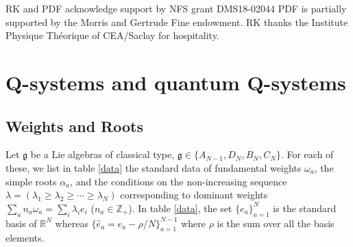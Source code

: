 \documentclass[12pt]{amsart}
\newcommand{\g}{{\mathfrak{g}}}
\newcommand{\Z}{{\mathbb Z}}
\newcommand{\R}{{\mathbb R}}
\numberwithin{equation}{section}
\numberwithin{table}{section}
\begin{document}
\bigskip

 RK and PDF acknowledge support by NFS grant DMS18-02044
PDF is partially supported by the Morris and Gertrude Fine endowment.
RK thanks the Institute Physique Th\'eorique of CEA/Saclay for hospitality.

\section{Q-systems and quantum Q-systems}

\subsection{Weights and Roots}\label{rootsec}



Let $\g$ be a Lie algebras of classical type, ${\mathfrak g}\in
\{A_{N-1},D_N,B_N,C_N\}$.
For each of these, we list in table \ref{data} the standard data of fundamental weights $\omega_a$, the simple roots $\alpha_a$, and the conditions on the non-increasing sequence $\lambda=(\lambda_1\geq\lambda_2\geq \cdots \geq \lambda_N)$ corresponding to dominant weights $\sum_a n_a \omega_a=\sum_i \lambda_i e_i$ ($n_a\in\Z_+$). 
In table \ref{data}, the set $\{e_a\}_{a=1}^N$ is the standard basis of $\R^N$ whereas $\{\hat{e}_a=e_a-\rho/N\}_{a=1}^{N-1}$ where $\rho$ is the sum over all the basis elements.
\end{document}
